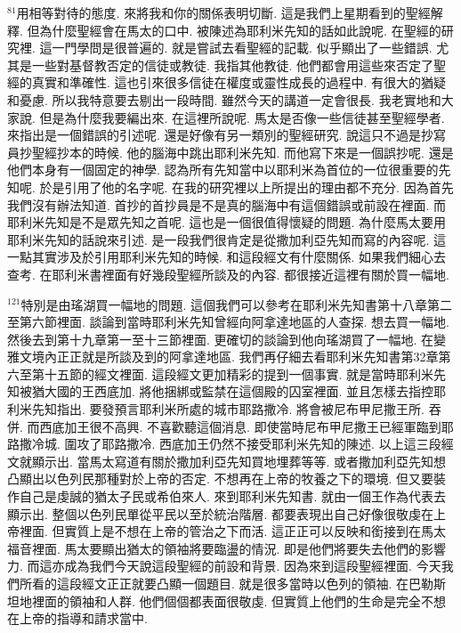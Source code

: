\documentclass{book}
\begin{document}
$^{81}$用相等對待的態度.
來將我和你的關係表明切斷.
這是我們上星期看到的聖經解釋.
但為什麼聖經會在馬太的口中.
被陳述為耶利米先知的話如此說呢.
在聖經的研究裡.
這一門學問是很普遍的.
就是嘗試去看聖經的記載.
似乎顯出了一些錯誤.
尤其是一些對基督教否定的信徒或教徒.
我指其他教徒.
他們都會用這些來否定了聖經的真實和準確性.
這也引來很多信徒在權度或靈性成長的過程中.
有很大的猶疑和憂慮.
所以我特意要去剔出一段時間.
雖然今天的講道一定會很長.
我老實地和大家說.
但是為什麼我要編出來.
在這裡所說呢.
馬太是否像一些信徒甚至聖經學者.
來指出是一個錯誤的引述呢.
還是好像有另一類別的聖經研究.
說這只不過是抄寫員抄聖經抄本的時候.
他的腦海中跳出耶利米先知.
而他寫下來是一個誤抄呢.
還是他們本身有一個固定的神學.
認為所有先知當中以耶利米為首位的一位很重要的先知呢.
於是引用了他的名字呢.
在我的研究裡以上所提出的理由都不充分.
因為首先我們沒有辦法知道.
首抄的首抄員是不是真的腦海中有這個錯誤或前設在裡面.
而耶利米先知是不是眾先知之首呢.
這也是一個很值得懷疑的問題.
為什麼馬太要用耶利米先知的話說來引述.
是一段我們很肯定是從撒加利亞先知而寫的內容呢.
這一點其實涉及於引用耶利米先知的時候.
和這段經文有什麼關係.
如果我們細心去查考.
在耶利米書裡面有好幾段聖經所談及的內容.
都很接近這裡有關於買一幅地.

$^{121}$特別是由瑤湖買一幅地的問題.
這個我們可以參考在耶利米先知書第十八章第二至第六節裡面.
談論到當時耶利米先知曾經向阿拿達地區的人查探.
想去買一幅地.
然後去到第十九章第一至十三節裡面.
更確切的談論到他向瑤湖買了一幅地.
在變雅文境內正正就是所談及到的阿拿達地區.
我們再仔細去看耶利米先知書第32章第六至第十五節的經文裡面.
這段經文更加精彩的提到一個事實.
就是當時耶利米先知被猶大國的王西底加.
將他捆綁或監禁在這個殿的囚室裡面.
並且怎樣去指控耶利米先知指出.
要發預言耶利米所處的城市耶路撒冷.
將會被尼布甲尼撒王所.
吞併.
而西底加王很不高興.
不喜歡聽這個消息.
即使當時尼布甲尼撒王已經軍臨到耶路撒冷城.
圍攻了耶路撒冷.
西底加王仍然不接受耶利米先知的陳述.
以上這三段經文就顯示出.
當馬太寫道有關於撒加利亞先知買地埋葬等等.
或者撒加利亞先知想凸顯出以色列民那種對於上帝的否定.
不想再在上帝的牧養之下的環境.
但又要裝作自己是虔誠的猶太子民或希伯來人.
來到耶利米先知書.
就由一個王作為代表去顯示出.
整個以色列民單從平民以至於統治階層.
都要表現出自己好像很敬虔在上帝裡面.
但實質上是不想在上帝的管治之下而活.
這正正可以反映和銜接到在馬太福音裡面.
馬太要顯出猶太的領袖將要臨盪的情況.
即是他們將要失去他們的影響力.
而這亦成為我們今天說這段聖經的前設和背景.
因為來到這段聖經裡面.
今天我們所看的這段經文正正就要凸顯一個題目.
就是很多當時以色列的領袖.
在巴勒斯坦地裡面的領袖和人群.
他們個個都表面很敬虔.
但實質上他們的生命是完全不想在上帝的指導和請求當中.
\end{document}
